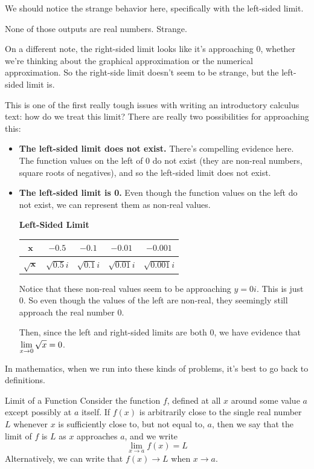 We should notice the strange behavior here, specifically with the left-sided limit.

None of those outputs are real numbers.
Strange.

On a different note, the right-sided limit looks like it's approaching 0, whether we're thinking about the graphical approximation or the numerical approximation.
So the right-side limit doesn't seem to be strange, but the left-sided limit is.

This is one of the first really tough issues with writing an introductory calculus text: how do we treat this limit?
There are really two possibilities for approaching this:
\begin{itemize}
  \item \textbf{The left-sided limit does not exist.} There's compelling evidence here.
  The function values on the left of 0 do not exist (they are non-real numbers, square roots of negatives), and so the left-sided limit does not exist.
  \item \textbf{The left-sided limit is 0.} Even though the function values on the left do not exist, we can represent them as non-real values.

  \textbf{Left-Sided Limit}

  \begin{tabular}{ccccc} \toprule
    $\bm{x}$ & $-0.5$ & $-0.1$ & $-0.01$ & $-0.001$ \\ \midrule
    $\bm{\sqrt{x}}$ & $\sqrt{0.5} i$ & $\sqrt{0.1} i$ & $\sqrt{0.01} i$ & $\sqrt{0.001} i$\\ \bottomrule
  \end{tabular}

  Notice that these non-real values seem to be approaching $y=0i$.
  This is just 0.
  So even though the values of the left are non-real, they seemingly still approach the real number 0.

  Then, since the left and right-sided limits are both 0, we have evidence that $\displaystyle \lim_{x\to 0} \sqrt{x}=0$.
\end{itemize}

In mathematics, when we run into these kinds of problems, it's best to go back to definitions.

\begin{defn}{Limit of a Function}
  Consider the function $f$, defined at all $x$ around some value $a$ except possibly at $a$ itself.
  If $f(x)$ is arbitrarily close to the single real number $L$ whenever $x$ is sufficiently close to, but not equal to, $a$, then we say that the limit of $f$ is $L$ as $x$ approaches $a$, and we write
  \[\lim_{x\to a} f(x) = L\]
  Alternatively, we can write that $f(x)\to L$ when $x\to a$.
\end{defn}

